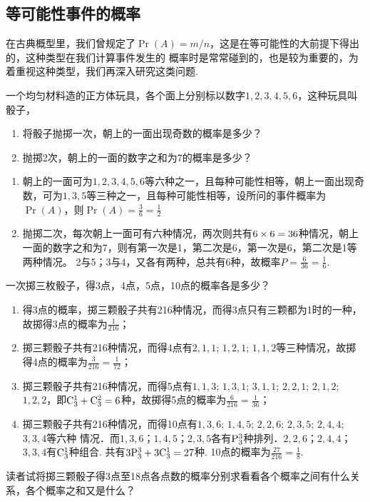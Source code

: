 \subsection{等可能性事件的概率}
在古典概型里，我们曾规定了$\Pr(A)=m/n$，这是在等可能性的大前提下得出的，这种类型在我们计算事件发生的
概率时是常常碰到的，也是较为重要的，为着重视这种类型，我们再深入研究这类问题.

\begin{example}
    一个均匀材料造的正方体玩具，各个面上分别标以数字$1,2,3,4,5,6$，这种玩具叫骰子，
\begin{enumerate}[(1)]
\item 将骰子抛掷一次，朝上的一面出现奇数的概率是多少？
\item 抛掷2次，朝上的一面的数字之和为7的概率是多少？
\end{enumerate}
\end{example}

\begin{solution}
\begin{enumerate}[(1)]
\item 朝上的一面可为$1,2,3,4,5,6$等六种之一，且每种可能性相等，朝上一面出现奇数，可为$1,3,5$等三种之一，且每种可能性相等，设所问的事件概率为$\Pr(A)$，则$\Pr(A)=\frac{3}{6}=\frac{1}{2}$
\item 抛掷二次，每次朝上一面可有六种情况，两次则共有$6\times6=36$种情况，朝上一面的数字之和为7，则有第一次是1，第二次是6，第一次是6，第二次是1等两种情况。
2与5；3与4，又各有两种，总共有6种，故概率$P=\frac{6}{36}=\frac{1}{6}$.
\end{enumerate}
\end{solution}

\begin{example}
    一次掷三枚骰子，得3点，4点，5点，10点的概率各是多少？
\end{example}

\begin{solution}
\begin{enumerate}[(1)]
    \item 得3点的概率，掷三颗骰子共有216种情况，而得3点只有三颗都为1时的一种，故掷得3点的概率为$\frac{1}{216}$；
    \item 掷三颗骰子共有216种情况，而得4点有$2,1,1$; $1,2,1$; $1,1,2$等三种情况，故掷得4点的概率为$\frac{3}{216}=\frac{1}{72}$；
\item 掷三颗骰子共有216种情况，而得5点有$1,1,3$; $1,3,1$; $3,1,1$; $2,2,1$; $2,1,2$; $1,2,2$，即${\rm C}^{1}_{3}+{\rm C}^{2}_{3}=6$种，故掷得5点的概率为$\frac{6}{216}=\frac{1}{36}$；
\item 掷三颗骰子共有216种情况，而得10点有$1,3,6$; $1,4,5$; $2,2,6$; $2,3,5$; $2,4,4$; $3,3,4$等六种
情况．而$1,3,6$；$1,4,5$；$2,3,5$各有${\rm P}^{3}_{3}$种排列．$2,2,6$；$2,4,4$；$3,3,4$有${\rm C}^{1}_{3}$种组合. 共有$3{\rm P}^{3}_{3}+3{\rm C}^{1}_{3}=27$种. 10点的概率为$\frac{27}{216}=\frac{1}{8}$.
\end{enumerate}  

读者试将掷三颗骰子得3点至18点各点数的概率分别求看看各个概率之间有什么关系，各个概率之和又是什么？
\end{solution}


